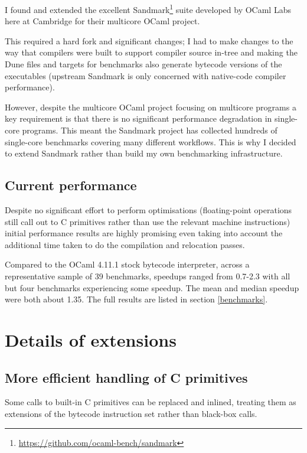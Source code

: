 \documentclass[12pt,a4paper, headings=standardclasses, parskip=on]{scrartcl}
\begin{document}
I found and extended the excellent
Sandmark\footnote{\url{https://github.com/ocaml-bench/sandmark}} suite
developed by OCaml Labs here at Cambridge for their multicore OCaml project.

This required a hard fork and significant changes; I had to make changes to
the way that compilers were built to support compiler source in-tree and
making the Dune files and targets for benchmarks also generate bytecode
versions of the executables (upstream Sandmark is only concerned with
native-code compiler performance).

However, despite the multicore OCaml project focusing on multicore programs a
key requirement is that there is no significant performance degradation in
single-core programs. This meant the Sandmark project has collected hundreds
of single-core benchmarks covering many different workflows. This is why I
decided to extend Sandmark rather than build my own benchmarking infrastructure.

\subsection{Current performance} \label{perf}

Despite no significant effort to perform optimisations (floating-point
operations still call out to C primitives rather than use the relevant
machine instructions) initial performance results are highly promising even
taking into account the additional time taken to do the compilation and
relocation passes.

Compared to the OCaml 4.11.1 stock bytecode interpreter, across a representative 
sample of 39 benchmarks, speedups ranged from 0.7-2.3 with all but four
benchmarks experiencing some speedup. The mean and median speedup were both about 1.35.
The full results are listed in section \ref{benchmarks}.

\section{Details of extensions} \label{extensions}

\subsection{More efficient handling of C primitives} \label{prims}

Some calls to built-in C primitives can be replaced and inlined, treating
them as extensions of the bytecode instruction set rather than black-box
calls.
\end{document}
